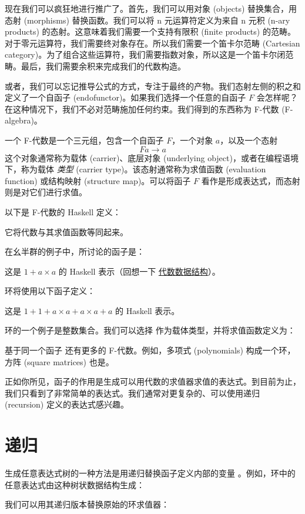 现在我们可以疯狂地进行推广了。首先，我们可以用对象 (objects) 替换集合，用态射 (morphisms) 替换函数。我们可以将 n 元运算符定义为来自 n 元积 (n-ary products) 的态射。这意味着我们需要一个支持有限积 (finite products) 的范畴。对于零元运算符，我们需要终对象存在。所以我们需要一个笛卡尔范畴 (Cartesian category)。为了组合这些运算符，我们需要指数对象，所以这是一个笛卡尔闭范畴。最后，我们需要余积来完成我们的代数构造。

或者，我们可以忘记推导公式的方式，专注于最终的产物。我们态射左侧的积之和定义了一个自函子 (endofunctor)。如果我们选择一个任意的自函子 $F$ 会怎样呢？在这种情况下，我们不必对范畴施加任何约束。我们得到的东西称为 F-代数 (F-algebra)。

一个 F-代数是一个三元组，包含一个自函子 $F$，一个对象 $a$，以及一个态射
\[F a \to a\]
这个对象通常称为载体 (carrier)、底层对象 (underlying object)，或者在编程语境下，称为载体 \emph{类型} (carrier type)。该态射通常称为求值函数 (evaluation function) 或结构映射 (structure map)。可以将函子 $F$ 看作是形成表达式，而态射则是对它们进行求值。

以下是 F-代数的 Haskell 定义：

它将代数与其求值函数等同起来。

在幺半群的例子中，所讨论的函子是：

这是 $1 + a\times{}a$ 的 Haskell 表示（回想一下 \hyperref[simple-algebraic-data-types]{代数数据结构}）。

环将使用以下函子定义：

这是 $1 + 1 + a\times{}a + a\times{}a + a$ 的 Haskell 表示。

环的一个例子是整数集合。我们可以选择  作为载体类型，并将求值函数定义为：

基于同一个函子  还有更多的 F-代数。例如，多项式 (polynomials) 构成一个环，方阵 (square matrices) 也是。

正如你所见，函子的作用是生成可以用代数的求值器求值的表达式。到目前为止，我们只看到了非常简单的表达式。我们通常对更复杂的、可以使用递归 (recursion) 定义的表达式感兴趣。

\section{递归}

生成任意表达式树的一种方法是用递归替换函子定义内部的变量 。例如，环中的任意表达式由这种树状数据结构生成：

我们可以用其递归版本替换原始的环求值器：

